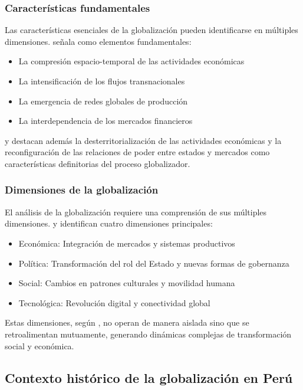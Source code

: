 \documentclass[12pt, a4paper]{article}
\begin{document}
\subsubsection{Características fundamentales}
Las características esenciales de la globalización pueden identificarse en múltiples dimensiones. \textcite{dicken2015} señala como elementos fundamentales:
\begin{itemize}
    \item La compresión espacio-temporal de las actividades económicas
    \item La intensificación de los flujos transnacionales
    \item La emergencia de redes globales de producción
    \item La interdependencia de los mercados financieros
\end{itemize}

\textcite{scholte2005} y \textcite{harvey2009} destacan además la desterritorialización de las actividades económicas y la reconfiguración de las relaciones de poder entre estados y mercados como características definitorias del proceso globalizador.

\subsubsection{Dimensiones de la globalización}
El análisis de la globalización requiere una comprensión de sus múltiples dimensiones. \textcite{keohane2018} y \textcite{nye2020} identifican cuatro dimensiones principales:
\begin{itemize}
    \item Económica: Integración de mercados y sistemas productivos
    \item Política: Transformación del rol del Estado y nuevas formas de gobernanza
    \item Social: Cambios en patrones culturales y movilidad humana
    \item Tecnológica: Revolución digital y conectividad global
\end{itemize}

Estas dimensiones, según \textcite{giddens2013}, no operan de manera aislada sino que se retroalimentan mutuamente, generando dinámicas complejas de transformación social y económica.

\subsection{Contexto histórico de la globalización en Perú}
\end{document}
